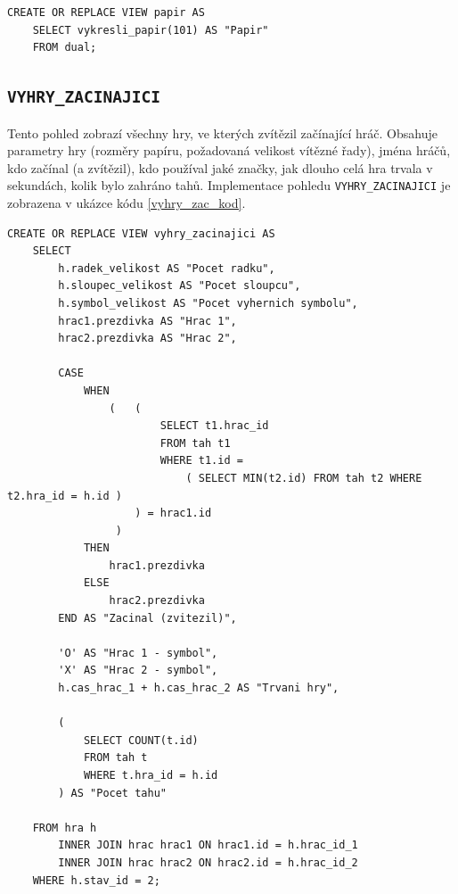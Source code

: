 \documentclass[
11pt,
a4paper,
pdftex,
czech,
titlepage
]{report}
\begin{document}
\renewcommand{\lstlistingname}{Ukázka kódu}
\begin{lstlisting}
CREATE OR REPLACE VIEW papir AS
    SELECT vykresli_papir(101) AS "Papir"
    FROM dual;
\end{lstlisting}

\subsection{\texttt{VYHRY\_ZACINAJICI}}\label{vyhry_zac_kap}
Tento pohled zobrazí všechny hry, ve kterých zvítězil začínající hráč. Obsahuje parametry hry (rozměry papíru, požadovaná velikost vítězné řady), jména hráčů, kdo začínal (a zvítězil), kdo používal jaké značky, jak dlouho celá hra trvala v sekundách, kolik bylo zahráno tahů. Implementace pohledu \texttt{VYHRY\_ZACINAJICI} je zobrazena v ukázce kódu \ref{vyhry_zac_kod}.

\renewcommand{\lstlistingname}{Ukázka kódu}
\begin{lstlisting}
CREATE OR REPLACE VIEW vyhry_zacinajici AS
    SELECT
        h.radek_velikost AS "Pocet radku",
        h.sloupec_velikost AS "Pocet sloupcu",
        h.symbol_velikost AS "Pocet vyhernich symbolu",
        hrac1.prezdivka AS "Hrac 1",
        hrac2.prezdivka AS "Hrac 2",
        
        CASE
            WHEN
                (   (   
                        SELECT t1.hrac_id
                        FROM tah t1
                        WHERE t1.id = 
                            ( SELECT MIN(t2.id) FROM tah t2 WHERE t2.hra_id = h.id )
                    ) = hrac1.id
                 )
            THEN
                hrac1.prezdivka
            ELSE
                hrac2.prezdivka
        END AS "Zacinal (zvitezil)",
        
        'O' AS "Hrac 1 - symbol",
        'X' AS "Hrac 2 - symbol",
        h.cas_hrac_1 + h.cas_hrac_2 AS "Trvani hry",
        
        (   
            SELECT COUNT(t.id)
            FROM tah t
            WHERE t.hra_id = h.id
        ) AS "Pocet tahu"
        
    FROM hra h
        INNER JOIN hrac hrac1 ON hrac1.id = h.hrac_id_1
        INNER JOIN hrac hrac2 ON hrac2.id = h.hrac_id_2
    WHERE h.stav_id = 2;
\end{lstlisting}
\end{document}

